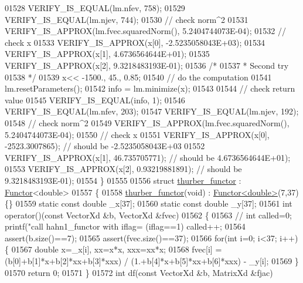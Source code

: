 \begin{DoxyCode}
01528   VERIFY\_IS\_EQUAL(lm.nfev, 758);
01529   VERIFY\_IS\_EQUAL(lm.njev, 744);
01530   \textcolor{comment}{// check norm^2}
01531   VERIFY\_IS\_APPROX(lm.fvec.squaredNorm(), 5.2404744073E-04);
01532   \textcolor{comment}{// check x}
01533   VERIFY\_IS\_APPROX(x[0], -2.5235058043E+03);
01534   VERIFY\_IS\_APPROX(x[1], 4.6736564644E+01);
01535   VERIFY\_IS\_APPROX(x[2], 9.3218483193E-01);
01536   \textcolor{comment}{/*}
01537 \textcolor{comment}{   * Second try}
01538 \textcolor{comment}{   */}
01539   x<< -1500., 45., 0.85;
01540   \textcolor{comment}{// do the computation}
01541   lm.resetParameters();
01542   info = lm.minimize(x);
01543 
01544   \textcolor{comment}{// check return value}
01545   VERIFY\_IS\_EQUAL(info, 1);
01546   VERIFY\_IS\_EQUAL(lm.nfev, 203);
01547   VERIFY\_IS\_EQUAL(lm.njev, 192);
01548   \textcolor{comment}{// check norm^2}
01549   VERIFY\_IS\_APPROX(lm.fvec.squaredNorm(), 5.2404744073E-04);
01550   \textcolor{comment}{// check x}
01551   VERIFY\_IS\_APPROX(x[0], -2523.3007865); \textcolor{comment}{// should be -2.5235058043E+03}
01552   VERIFY\_IS\_APPROX(x[1], 46.735705771); \textcolor{comment}{// should be 4.6736564644E+01);}
01553   VERIFY\_IS\_APPROX(x[2], 0.93219881891); \textcolor{comment}{// should be 9.3218483193E-01);}
01554 \}
01555 
01556 \textcolor{keyword}{struct }\hyperlink{structthurber__functor}{thurber\_functor} : \hyperlink{struct_functor}{Functor}<double>
01557 \{
01558     \hyperlink{structthurber__functor}{thurber\_functor}(\textcolor{keywordtype}{void}) : \hyperlink{struct_functor}{Functor<double>}(7,37) \{\}
01559     \textcolor{keyword}{static} \textcolor{keyword}{const} \textcolor{keywordtype}{double} \_x[37];
01560     \textcolor{keyword}{static} \textcolor{keyword}{const} \textcolor{keywordtype}{double} \_y[37];
01561     \textcolor{keywordtype}{int} operator()(\textcolor{keyword}{const} VectorXd &b, VectorXd &fvec)
01562     \{
01563         \textcolor{comment}{//        int called=0; printf("call hahn1\_functor with  iflag=%
       (iflag==1) called++;}
01564         assert(b.size()==7);
01565         assert(fvec.size()==37);
01566         \textcolor{keywordflow}{for}(\textcolor{keywordtype}{int} i=0; i<37; i++) \{
01567             \textcolor{keywordtype}{double} x=\_x[i], xx=x*x, xxx=xx*x;
01568             fvec[i] = (b[0]+b[1]*x+b[2]*xx+b[3]*xxx) / (1.+b[4]*x+b[5]*xx+b[6]*xxx) - \_y[i];
01569         \}
01570         \textcolor{keywordflow}{return} 0;
01571     \}
01572     \textcolor{keywordtype}{int} df(\textcolor{keyword}{const} VectorXd &b, MatrixXd &fjac)

\end{DoxyCode}
